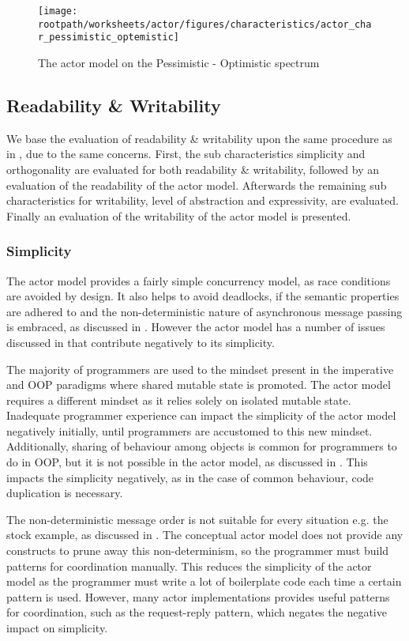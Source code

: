 \begin{figure}[htbp]
\centering
 \texttt{[image: \\rootpath/worksheets/actor/figures/characteristics/actor\_char\_pessimistic\_optemistic]} 
 \caption{The actor model on the Pessimistic - Optimistic spectrum}
\label{fig:actor_pes_opti}
\end{figure}

\subsection{Readability \& Writability}
We base the evaluation of readability \& writability upon the same procedure as in , due to the same concerns. First, the sub characteristics simplicity and orthogonality are evaluated for both readability \& writability, followed by an evaluation of the readability of the actor model. Afterwards the remaining sub characteristics for writability, level of abstraction and expressivity, are evaluated. Finally an evaluation of the writability of the actor model is presented.

\subsubsection{Simplicity}\label{subsec:actor_simplicity_read}
The actor model provides a fairly simple concurrency model, as race conditions are avoided by design. It also helps to avoid deadlocks, if the semantic properties are adhered to and the non-deterministic nature of asynchronous message passing is embraced, as discussed in . However the actor model has a number of issues discussed in  that contribute negatively to its simplicity.

The majority of programmers are used to the mindset present in the imperative and \ac{OOP} paradigms where shared mutable state is promoted. The actor model requires a different mindset as it relies solely on isolated mutable state\cite[p. 9]{karmani2009actor}. Inadequate programmer experience can impact the simplicity of the actor model negatively initially, until programmers are accustomed to this new mindset. Additionally, sharing of behaviour among objects is common for programmers to do in \ac{OOP}, but it is not possible in the actor model, as discussed in . This impacts the simplicity negatively, as in the case of common behaviour, code duplication is necessary.

The non-deterministic message order is not suitable for every situation e.g. the stock example, as discussed in . The conceptual actor model does not provide any constructs to prune away this non-determinism, so the programmer must build patterns for coordination manually. This reduces the simplicity of the actor model as the programmer must write a lot of boilerplate code each time a certain pattern is used. However, many actor implementations provides useful patterns for coordination, such as the request-reply pattern, which negates the negative impact on simplicity.

